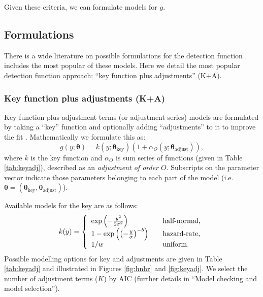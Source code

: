 \documentclass[article]{jss}
\begin{document}
Given these criteria, we can formulate models for \(g\).

\subsection{Formulations}\label{formulations}

There is a wide literature on possible formulations for the detection
function
\citep{Buckland:1992fa, Eidous:2005bj, Becker:2009cj, Giammarino:2014eg, Miller:2015hw, Becker:2015fi}.
 includes the most popular of these models. Here we
detail the most popular detection function approach: ``key function plus
adjustments'' (K+A).

\subsubsection{Key function plus adjustments
(K+A)}\label{key-function-plus-adjustments-ka}

Key function plus adjustment terms (or adjustment series) models are
formulated by taking a ``key'' function and optionally adding
``adjustments'' to it to improve the fit \citep{Buckland:1992fa}.
Mathematically we formulate this as: \[
g(y; \boldsymbol{\theta}) = k(y; \boldsymbol{\theta}_\text{key})\left( 1+ \alpha_O(y; \boldsymbol{\theta}_\text{adjust})\right),
\] where \(k\) is the key function and \(\alpha_O\) is sum series of
functions (given in Table \ref{tab:keyadj}), described as an
\emph{adjustment of order \(O\)}. Subscripts on the parameter vector
indicate those parameters belonging to each part of the model (i.e.
\(\boldsymbol{\theta} = (\boldsymbol{\theta}_\text{key}, \boldsymbol{\theta}_\text{adjust})\)).

Available models for the key are as follows: \[
k(y) = \left\{
\begin{array}{l l}
  \exp\left(-\frac{y^2}{2 \sigma^2}\right) & \quad \text{half-normal,} \\
  1-\exp\left(\left(-\frac{y}{\sigma}\right)^{-b}\right) & \quad \text{hazard-rate,} \\
  1/w & \quad \text{uniform.}
\end{array} \right.
\] Possible modelling options for key and adjustments are given in Table
\ref{tab:keyadj} and illustrated in Figures \ref{fig:hnhr} and
\ref{fig:keyadj}. We select the number of adjustment terms (\(K\)) by
AIC (further details in ``Model checking and model selection'').
\end{document}
